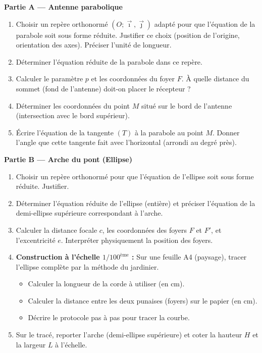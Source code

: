 \documentclass[11pt]{article}
\begin{document}
\medskip
\noindent \textbf{Partie A — Antenne parabolique}
\begin{enumerate}
    \item Choisir un repère orthonormé $(O;\vec{\imath},\vec{\jmath})$ adapté pour que l'équation de la parabole soit sous forme réduite. Justifier ce choix (position de l'origine, orientation des axes). Préciser l'unité de longueur.
    \item Déterminer l'équation réduite de la parabole dans ce repère.
    \item Calculer le paramètre $p$ et les coordonnées du foyer $F$. À quelle distance du sommet (fond de l'antenne) doit-on placer le récepteur ?
    \item Déterminer les coordonnées du point $M$ situé sur le bord de l'antenne (intersection avec le bord supérieur).
    \item Écrire l'équation de la tangente $(T)$ à la parabole au point $M$. Donner l'angle que cette tangente fait avec l'horizontal (arrondi au degré près).
\end{enumerate}

\medskip
\noindent \textbf{Partie B — Arche du pont (Ellipse)}
\begin{enumerate}
    \item Choisir un repère orthonormé pour que l'équation de l'ellipse soit sous forme réduite. Justifier.
    \item Déterminer l'équation réduite de l'ellipse (entière) et préciser l'équation de la demi-ellipse supérieure correspondant à l'arche.
    \item Calculer la distance focale $c$, les coordonnées des foyers $F$ et $F'$, et l'excentricité $e$. Interpréter physiquement la position des foyers.
    \item \textbf{Construction à l'échelle $1/100^{\text{ème}}$ :} Sur une feuille A4 (paysage), tracer l'ellipse complète par la méthode du jardinier.
    \begin{itemize}
        \item Calculer la longueur de la corde à utiliser (en cm).
        \item Calculer la distance entre les deux punaises (foyers) sur le papier (en cm).
        \item Décrire le protocole pas à pas pour tracer la courbe.
    \end{itemize}
    \item Sur le tracé, reporter l'arche (demi-ellipse supérieure) et coter la hauteur $H$ et la largeur $L$ à l'échelle.
\end{enumerate}
\end{document}
